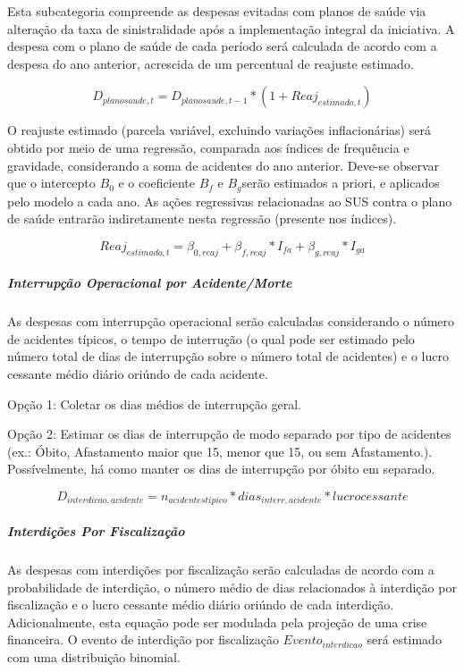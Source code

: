 \documentclass[]{article}
\let\oldsubparagraph\subparagraph
\renewcommand{\subparagraph}[1]{\oldsubparagraph{#1}\mbox{}}
\begin{document}
Esta subcategoria compreende as despesas evitadas com planos de saúde
via alteração da taxa de sinistralidade após a implementação integral da
iniciativa. A despesa com o plano de saúde de cada período será
calculada de acordo com a despesa do ano anterior, acrescida de um
percentual de reajuste estimado.

\[D_{planosaude,t} = D_{planosaude,t-1} * (1 + Reaj_{estimado,t})\]

O reajuste estimado (parcela variável, excluindo variações
inflacionárias) será obtido por meio de uma regressão, comparada aos
índices de frequência e gravidade, considerando a soma de acidentes do
ano anterior. Deve-se observar que o intercepto \(B_0\) e o coeficiente
\(B_f\) e \(B_g\)serão estimados a priori, e aplicados pelo modelo a
cada ano. As ações regressivas relacionadas ao SUS contra o plano de
saúde entrarão indiretamente nesta regressão (presente nos índices).

\[Reaj_{estimado,t} = \beta_{0,reaj} +\beta_{f,reaj} * I_{fa} + \beta_{g,reaj} * I_{ga}\]

\subparagraph{Interrupção Operacional por
Acidente/Morte}\label{interrupcao-operacional-por-acidentemorte}

As despesas com interrupção operacional serão calculadas considerando o
número de acidentes típicos, o tempo de interrução (o qual pode ser
estimado pelo número total de dias de interrupção sobre o número total
de acidentes) e o lucro cessante médio diário oriúndo de cada acidente.

Opção 1: Coletar os dias médios de interrupção geral.

Opção 2: Estimar os dias de interrupção de modo separado por tipo de
acidentes (ex.: Óbito, Afastamento maior que 15, menor que 15, ou sem
Afastamento.). Possívelmente, há como manter os dias de interrupção por
óbito em separado.

\[D_{interdicao,acidente} = n_{acidentestipico} * dias_{interr,acidente} * lucrocessante\]

\subparagraph{Interdições Por
Fiscalização}\label{interdicoes-por-fiscalizacao}

As despesas com interdições por fiscalização serão calculadas de acordo
com a probabilidade de interdição, o número médio de dias relacionados à
interdição por fiscalização e o lucro cessante médio diário oriúndo de
cada interdição. Adicionalmente, esta equação pode ser modulada pela
projeção de uma crise financeira. O evento de interdição por
fiscalização \(Evento_{interdicao}\) será estimado com uma distribuição
binomial.
\end{document}
